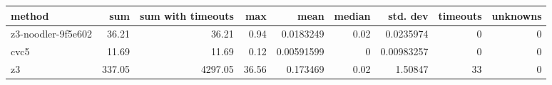 \begin{tabular}{lrrrrrrrr}
\hline
 method             &    sum &   sum with timeouts &   max &       mean &   median &   std. dev &   timeouts &   unknowns \\
\hline
 z3-noodler-9f5e602 &  36.21 &               36.21 &  0.94 & 0.0183249  &     0.02 & 0.0235974  &          0 &          0 \\
 cvc5               &  11.69 &               11.69 &  0.12 & 0.00591599 &     0    & 0.00983257 &          0 &          0 \\
 z3                 & 337.05 &             4297.05 & 36.56 & 0.173469   &     0.02 & 1.50847    &         33 &          0 \\
\hline
\end{tabular}
